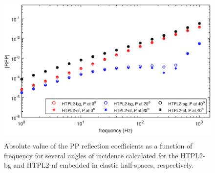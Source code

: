 \documentclass[draft]{agujournal2019}
\begin{document}
\begin{figure}[!ht]
\centering
        \includegraphics[width= 120mm, height=75mm]{rpp_2sandfracw.eps}
\caption{ Absolute value of the PP reflection coefficients as a function of frequency for several angles of incidence calculated for the HTPL2-bg and HTPL2-nf embedded in elastic half-spaces, respectively. }
\label{fig.10}
\end{figure}
\end{document}
